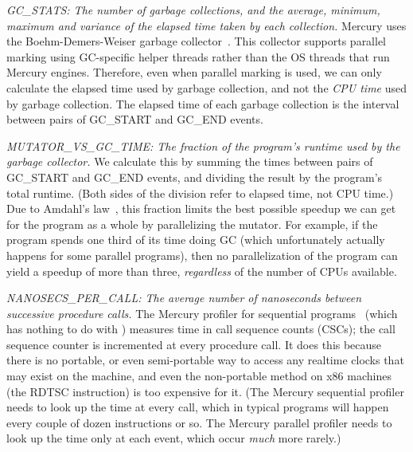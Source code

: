 
\emph{GC\_STATS: The number of garbage collections,
and the average, minimum, maximum and variance
of the elapsed time taken by each collection.}
Mercury uses the Boehm-Demers-Weiser garbage collector~\cite{boehm}.
This collector supports parallel marking using GC-specific helper threads
rather than the OS threads that run Mercury engines.
Therefore, even when parallel marking is used,
we can only calculate the elapsed time used by garbage collection,
and not the \emph{CPU time} used by garbage collection.
The elapsed time of each garbage collection
is the interval between pairs of GC\_START and GC\_END events.

\emph{MUTATOR\_VS\_GC\_TIME:
The fraction of the program's runtime used by the garbage collector.}
We calculate this by summing the times
between pairs of GC\_START and GC\_END events,
and dividing the result by the program's total runtime.
(Both sides of the division refer to elapsed time, not CPU time.)
Due to Amdahl's law~\cite{amdahl:1967:law},
this fraction limits the best possible speedup we can get
for the program as a whole by parallelizing the mutator.
For example, if the program spends one third of its time doing GC
(which unfortunately actually happens for some parallel programs),
then no parallelization of the program can yield a speedup of more than three,
\emph{regardless} of the number of CPUs available.

\emph{NANOSECS\_PER\_CALL:
The average number of nanoseconds between successive procedure calls.}
The Mercury profiler for sequential programs~\cite{conway:2001:mercury-deep}
(which has nothing to do with \tscope)
measures time in call sequence counts (CSCs);
the call sequence counter is incremented at every procedure call.
It does this because there is no portable, or even semi-portable way
to access any realtime clocks that may exist on the machine,
and even the non-portable method on x86 machines (the RDTSC instruction)
is too expensive for it.
(The Mercury sequential profiler needs to look up the time at every call,
which in typical programs will happen every couple of dozen instructions or so.
The Mercury parallel profiler needs to look up the time only at each event,
which occur \emph{much} more rarely.)

